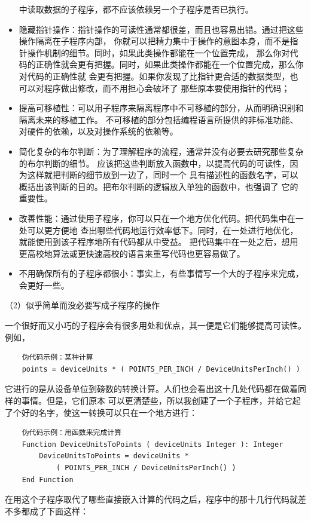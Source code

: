 \documentclass{article}
\begin{document}
\begin{itemize}
    中读取数据的子程序，都不应该依赖另一个子程序是否已执行。
    \item 隐藏指针操作：指针操作的可读性通常都很差，而且也容易出错。通过把这些操作隔离在子程序内部，
    你就可以把精力集中于操作的意图本身，而不是指针操作机制的细节。同时，如果此类操作都能在一个位置完成，
    那么你对代码的正确性就会更有把握。同时，如果此类操作都能在一个位置完成，那么你对代码的正确性就
    会更有把握。如果你发现了比指针更合适的数据类型，也可以对程序做出修改，而不用担心会破坏了
    那些原本要使用指针的代码；
    \item 提高可移植性：可以用子程序来隔离程序中不可移植的部分，从而明确识别和隔离未来的移植工作。
    不可移植的部分包括编程语言所提供的非标准功能、对硬件的依赖，以及对操作系统的依赖等。
    \item 简化复杂的布尔判断：为了理解程序的流程，通常并没有必要去研究那些复杂的布尔判断的细节。
    应该把这些判断放入函数中，以提高代码的可读性，因为这样就把判断的细节放到一边了，同时一个
    具有描述性的函数名字，可以概括出该判断的目的。把布尔判断的逻辑放入单独的函数中，也强调了
    它的重要性。
    \item 改善性能：通过使用子程序，你可以只在一个地方优化代码。把代码集中在一处可以更方便地
    查出哪些代码地运行效率低下。同时，在一处进行地优化，就能使用到该子程序地所有代码都从中受益。
    把代码集中在一处之后，想用更高校地算法或更快速高校的语言来重写代码也更容易做了。
    \item 不用确保所有的子程序都很小：事实上，有些事情写一个大的子程序来完成，会更好一些。
\end{itemize}
\par
（2）似乎简单而没必要写成子程序的操作
\par
一个很好而又小巧的子程序会有很多用处和优点，其一便是它们能够提高可读性。例如，
\begin{lstlisting}
    伪代码示例：某种计算
    points = deviceUnits * ( POINTS_PER_INCH / DeviceUnitsPerInch() )
\end{lstlisting}
它进行的是从设备单位到磅数的转换计算。人们也会看出这十几处代码都在做着同样的事情。但是，它们原本
可以更清楚些，所以我创建了一个子程序，并给它起了个好的名字，使这一转换可以只在一个地方进行：
\begin{lstlisting}
    伪代码示例：用函数来完成计算
    Function DeviceUnitsToPoints ( deviceUnits Integer ): Integer
        DeviceUnitsToPoints = deviceUnits * 
            ( POINTS_PER_INCH / DeviceUnitsPerInch() )
    End Function
\end{lstlisting}
在用这个子程序取代了哪些直接嵌入计算的代码之后，程序中的那十几行代码就差不多都成了下面这样：
\end{document}

